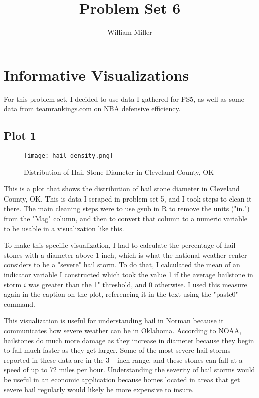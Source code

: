 \documentclass{article}
\title{Problem Set 6}
\author{William Miller}
\begin{document}
\maketitle

\section{Informative Visualizations}

For this problem set, I decided to use data I gathered for PS5, as well as some data from \href{https://www.teamrankings.com/nba/stat/defensive-efficiency?date=2025-03-11}{teamrankings.com}
on NBA defensive efficiency.

\subsection{Plot 1}

\begin{figure}[h] 
    \centering
    \texttt{[image: hail\_density.png]}
    \caption{Distribution of Hail Stone Diameter in Cleveland County, OK}
    \label{fig:hail density}
\end{figure}

This is a plot that shows the distribution of hail stone diameter in Cleveland County, OK. This is data I scraped in problem set 5, and I took steps to clean it there. The main cleaning steps were to use gsub in R to remove the units ("in.") from the "Mag" column, and then to convert that column to a numeric variable to be usable in a visualization like this.

To make this specific visualization, I had to calculate the percentage of hail stones with a diameter above 1 inch, which is what the national weather center considers to be a "severe" hail storm. To do that, I calculated the mean of an indicator variable I constructed which took the value 1 if the average hailstone in storm $i$ was greater than the 1" threshold, and 0 otherwise. I used this measure again in the caption on the plot, referencing it in the text using the "paste0" command.

This visualization is useful for understanding hail in Norman because it communicates how severe weather can be in Oklahoma. According to NOAA, hailstones do much more damage as they increase in diameter because they begin to fall much faster as they get larger. Some of the most severe hail storms reported in these data are in the 3+ inch range, and these stones can fall at a speed of up to 72 miles per hour. Understanding the severity of hail storms would be useful in an economic application because homes located in areas that get severe hail regularly would likely be more expensive to insure. 
\end{document}
